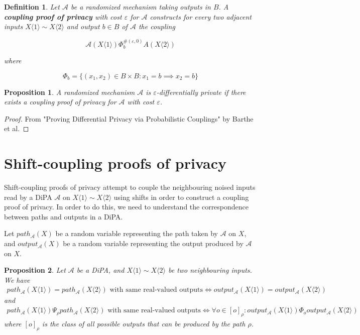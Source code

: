 \documentclass{article}
\newtheorem{proposition}{Proposition}[section]
\newtheorem{definition}{Definition}[section]
\renewcommand{\epsilon}{\varepsilon}
\newcommand{\1}{\langle 1 \rangle}
\newcommand{\2}{\langle 2 \rangle}
\begin{document}
\begin{definition}
    Let $\mathcal{A}$ be a randomized mechanism taking outputs in $B$. A \textbf{coupling proof of privacy} with cost $\epsilon$ for $\mathcal{A}$ constructs for every two adjacent inputs $X \1 \sim X \2$ and output $b \in B$ of $\mathcal{A}$ the coupling 

    \[\mathcal{A}(X \1) \Phi_b^{\#(\epsilon, 0)} A(X \2)\]

    where 

    \[\Phi_{b} = \{(x_1, x_2) \in B \times B : x_1 = b \implies x_2 = b\}\]
\end{definition}

\begin{proposition}
    A randomized mechanism $\mathcal{A}$ is $\epsilon$-differentially private if there exists a coupling proof of privacy for $\mathcal{A}$ with cost $\epsilon$.
\end{proposition}

\begin{proof}
    From "Proving Differential Privacy via Probabilistic Couplings" by Barthe et al. 
\end{proof}

\section{Shift-coupling proofs of privacy}

Shift-coupling proofs of privacy attempt to couple the neighbouring noised inputs read by a DiPA $\mathcal{A}$ on $X \1 \sim X \2$ using shifts in order to construct a coupling proof of privacy. In order to do this, we need to understand the correspondence between paths and outputs in a DiPA.

Let $path_{\mathcal{A}}(X)$ be a random variable representing the path taken by $\mathcal{A}$ on $X$, and $output_{\mathcal{A}}(X)$ be a random variable representing the output produced by $\mathcal{A}$ on $X$.

\begin{proposition}
    \label{prop:output_determinism}
    Let $\mathcal{A}$ be a DiPA, and $X \1 \sim X \2$ be two neighbouring inputs. We have 
    \begin{align*}
        path_{\mathcal{A}}(X \1) = path_{\mathcal{A}}(X \2) \text{ with same real-valued outputs} \iff output_{\mathcal{A}}(X \1) = output_{\mathcal{A}}(X \2)
    \end{align*}
    and 
    \begin{align*}
        path_{\mathcal{A}}(X \1) \Psi_\rho path_{\mathcal{A}}(X \2) \text{ with same real-valued outputs} \iff \forall o \in [o]_\rho : output_{\mathcal{A}}(X \1) \Phi_o output_{\mathcal{A}}(X \2)
    \end{align*}
    where $[o]_\rho$ is the class of all possible outputs that can be produced by the path $\rho$.
\end{proposition}
\end{document}

